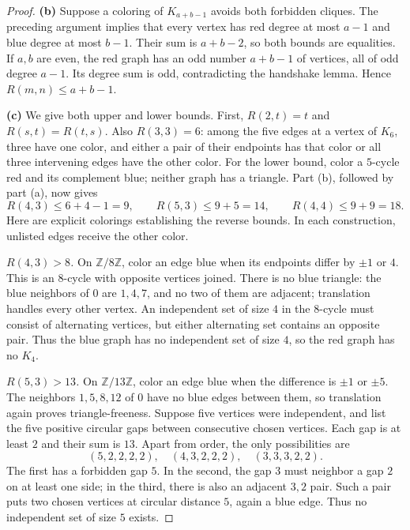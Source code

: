 \documentclass[12pt]{amsart}
\begin{document}
\begin{onehalfspace}
\begin{proof}
            \textbf{(b)} Suppose a coloring of $K_{a+b-1}$ avoids both
            forbidden cliques. The preceding argument implies that every
            vertex has red degree at most $a-1$ and blue degree at most
            $b-1$. Their sum is $a+b-2$, so both bounds are equalities.
            If $a,b$ are even, the red graph has an odd number $a+b-1$
            of vertices, all of odd degree $a-1$. Its degree sum is odd,
            contradicting the handshake lemma. Hence $R(m,n)\le a+b-1$.

            \textbf{(c)} We give both upper and lower bounds. First,
            $R(2,t)=t$ and $R(s,t)=R(t,s)$. Also $R(3,3)=6$:
            among the five edges at a vertex of $K_6$, three have one
            color, and either a pair of their endpoints has that color
            or all three intervening edges have the other color. For
            the lower bound, color a $5$-cycle red and its complement blue;
            neither graph has a triangle.
            Part (b), followed by part (a), now gives
            \[
                R(4,3)\le 6+4-1=9,\qquad
                R(5,3)\le 9+5=14,\qquad
                R(4,4)\le 9+9=18.
            \]
            Here are explicit colorings establishing the reverse bounds.
            In each construction, unlisted edges receive the other color.

            \emph{$R(4,3)>8$.} On $\mathbb Z/8\mathbb Z$, color an edge
            blue when its endpoints differ by $\pm1$ or $4$.
            This is an $8$-cycle with opposite vertices joined. There is
            no blue triangle: the blue neighbors of $0$ are $1,4,7$,
            and no two of them are adjacent; translation handles every
            other vertex. An independent set of size $4$ in the $8$-cycle
            must consist of alternating vertices, but either alternating
            set contains an opposite pair. Thus the blue graph has no
            independent set of size $4$, so the red graph has no $K_4$.

            \emph{$R(5,3)>13$.} On $\mathbb Z/13\mathbb Z$, color an edge
            blue when the difference is $\pm1$ or $\pm5$.
            The neighbors $1,5,8,12$ of $0$ have no blue edges between them,
            so translation again proves triangle-freeness.
            Suppose five vertices were independent, and list the five
            positive circular gaps between consecutive chosen vertices.
            Each gap is at least $2$ and their sum is $13$. Apart from order,
            the only possibilities are
            \[
                (5,2,2,2,2),\quad (4,3,2,2,2),\quad (3,3,3,2,2).
            \]
            The first has a forbidden gap $5$. In the second, the gap $3$
            must neighbor a gap $2$ on at least one side; in the third,
            there is also an adjacent $3,2$ pair. Such a pair puts two
            chosen vertices at circular distance $5$, again a blue edge.
            Thus no independent set of size $5$ exists.


\end{proof}
\end{onehalfspace}
\end{document}
